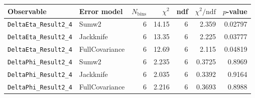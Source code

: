 \begin{tabular}{|l|l|r|r|r|r|r|}
\hline
Observable & Error model & $N_{\mathrm{bins}}$ & $\chi^2$ & ndf & $\chi^2/\mathrm{ndf}$ & $p$-value \\
\hline
\texttt{DeltaEta\_Result2\_4} & Sumw2 & 6 & 14.15 & 6 & 2.359 & 0.02797 \\
\texttt{DeltaEta\_Result2\_4} & Jackknife & 6 & 13.35 & 6 & 2.225 & 0.03777 \\
\texttt{DeltaEta\_Result2\_4} & FullCovariance & 6 & 12.69 & 6 & 2.115 & 0.04819 \\
\texttt{DeltaPhi\_Result2\_4} & Sumw2 & 6 & 2.235 & 6 & 0.3725 & 0.8969 \\
\texttt{DeltaPhi\_Result2\_4} & Jackknife & 6 & 2.035 & 6 & 0.3392 & 0.9164 \\
\texttt{DeltaPhi\_Result2\_4} & FullCovariance & 6 & 2.216 & 6 & 0.3693 & 0.8988 \\
\hline
\end{tabular}
